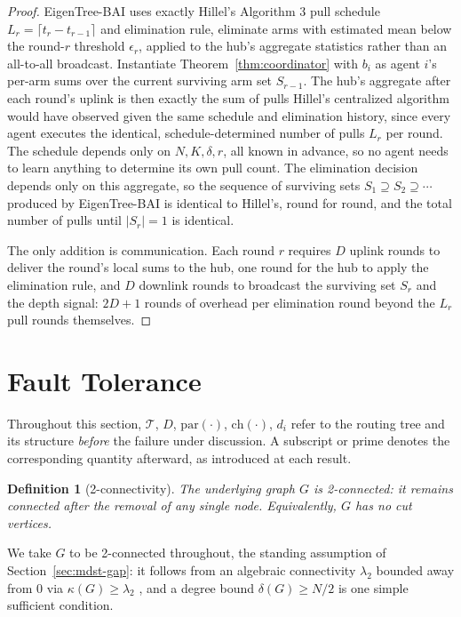 \documentclass[letterpaper]{article} %
\newtheorem{definition}{Definition}
\begin{document}
\begin{proof}
EigenTree-BAI uses exactly Hillel's Algorithm 3 pull schedule $L_r = \lceil t_r
- t_{r-1}\rceil$ and elimination rule, eliminate arms with estimated mean
below the round-$r$ threshold $\epsilon_r$, applied to the hub's aggregate
statistics rather than an all-to-all broadcast. Instantiate
Theorem~\ref{thm:coordinator} with $b_i$ as agent $i$'s per-arm sums over
the current surviving arm set $S_{r-1}$. The hub's aggregate after each
round's uplink is then exactly the sum of pulls Hillel's centralized
algorithm would have observed given the same schedule and elimination
history, since every agent executes the identical, schedule-determined
number of pulls $L_r$ per round. The schedule depends only on
$N,K,\delta,r$, all known in advance, so no agent needs to learn anything
to determine its own pull count. The elimination decision depends only on
this aggregate, so the sequence of surviving sets $S_1 \supseteq S_2
\supseteq \cdots$ produced by EigenTree-BAI is identical to Hillel's, round for
round, and the total number of pulls until $|S_r|=1$ is identical.

The only addition is communication. Each round $r$ requires $D$ uplink
rounds to deliver the round's local sums to the hub, one round for the hub
to apply the elimination rule, and $D$ downlink rounds to broadcast the
surviving set $S_r$ and the depth signal: $2D+1$ rounds of overhead per
elimination round beyond the $L_r$ pull rounds themselves.
\end{proof}

\section{Fault Tolerance}
\label{sec:ft}

Throughout this section, $\mathcal{T}$, $D$, $\mathrm{par}(\cdot)$,
$\mathrm{ch}(\cdot)$, $d_i$ refer to the routing tree and its structure
\emph{before} the failure under discussion. A subscript or prime denotes
the corresponding quantity afterward, as introduced at each result.

\begin{definition}[2-connectivity]
\label{def:2conn}
The underlying graph $G$ is \emph{2-connected}: it remains connected after the removal of any single node. Equivalently, $G$ has no cut vertices.
\end{definition}

We take $G$ to be 2-connected throughout, the standing assumption of
Section~\ref{sec:mdst-gap}: it follows from an algebraic connectivity $\lambda_2$
bounded away from $0$ via $\kappa(G)\geq\lambda_2$ \citep{fiedler1973}, and a
degree bound $\delta(G)\geq N/2$ is one simple sufficient condition.
\end{document}
